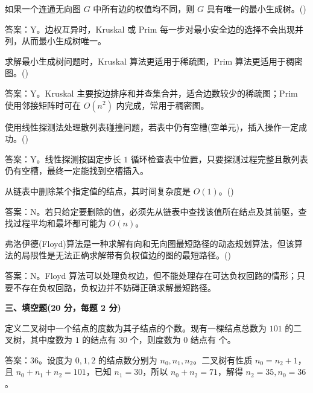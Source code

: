 \begin{question}
如果一个连通无向图 $G$ 中所有边的权值均不同，则 $G$ 具有唯一的最小生成树。(\quad)
\begin{solution}
答案：Y。边权互异时，Kruskal 或 Prim 每一步对最小安全边的选择不会出现并列，从而最小生成树唯一。
\end{solution}
\end{question}

\begin{question}
求解最小生成树问题时，Kruskal 算法更适用于稀疏图，Prim 算法更适用于稠密图。(\quad)
\begin{solution}
答案：Y。Kruskal 主要按边排序和并查集合并，适合边数较少的稀疏图；Prim 使用邻接矩阵时可在 $O(n^2)$ 内完成，常用于稠密图。
\end{solution}
\end{question}

\begin{question}
使用线性探测法处理散列表碰撞问题，若表中仍有空槽(空单元)，插入操作一定成功。(\quad)
\begin{solution}
答案：Y。线性探测按固定步长 $1$ 循环检查表中位置，只要探测过程完整且散列表仍有空槽，最终一定能找到空槽插入。
\end{solution}
\end{question}

\begin{question}
从链表中删除某个指定值的结点，其时间复杂度是 $O(1)$。(\quad)
\begin{solution}
答案：N。若只给定要删除的值，必须先从链表中查找该值所在结点及其前驱，查找过程平均和最坏都可能为 $O(n)$。
\end{solution}
\end{question}

\begin{question}
弗洛伊德(Floyd)算法是一种求解有向和无向图最短路径的动态规划算法，但该算法的局限性是无法正确求解带有负权值边的图的最短路径。(\quad)
\begin{solution}
答案：N。Floyd 算法可以处理负权边，但不能处理存在可达负权回路的情形；只要不存在负权回路，负权边并不妨碍正确求解最短路径。
\end{solution}
\end{question}

\textbf{三、填空题(20 分，每题 2 分)}

\begin{question}
定义二叉树中一个结点的度数为其子结点的个数。现有一棵结点总数为 $101$ 的二叉树，其中度数为 $1$ 的结点有 $30$ 个，则度数为 $0$ 结点有 \blank 个。
\begin{solution}
答案：$36$。设度为 $0,1,2$ 的结点数分别为 $n_0,n_1,n_2$。二叉树有性质 $n_0=n_2+1$，且 $n_0+n_1+n_2=101$，已知 $n_1=30$，所以 $n_0+n_2=71$，解得 $n_2=35,n_0=36$。
\end{solution}
\end{question}

